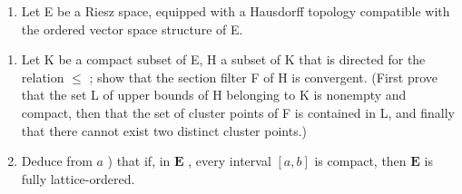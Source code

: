 \begin{enumerate}
\def\labelenumi{\arabic{enumi})}
\setcounter{enumi}{13}
\tightlist
\item
  Let E be a Riesz space, equipped with a Hausdorff topology compatible with the ordered vector space structure of E.
\end{enumerate}

\begin{enumerate}
\def\labelenumi{\alph{enumi})}
\item
  Let K be a compact subset of E, H a subset of K that is directed for the relation \(\leqslant\) ; show that the section filter F of H is convergent. (First prove that the set L of upper bounds of H belonging to K is nonempty and compact, then that the set of cluster points of F is contained in L, and finally that there cannot exist two distinct cluster points.)
\item
  Deduce from \(a\) ) that if, in \(\mathbf{E}\) , every interval \([a,b]\) is compact, then \(\mathbf{E}\) is fully lattice-ordered.
\end{enumerate}

\setcounter{exercisegroup}{2}
\edef\CurrentExerciseGroup{\arabic{exercisegroup}}
